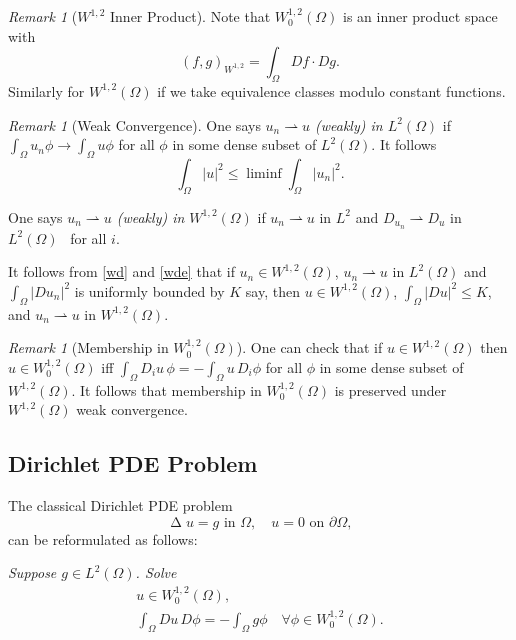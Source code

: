 \documentclass[a4paper]{amsart}
\theoremstyle{plain}
\theoremstyle{definition}
\theoremstyle{remark}
\newtheorem{remark}[theorem]{Remark}
\DeclareMathOperator{\lap}{\Delta}
\begin{document}
\begin{remark}[$ W^{1,2}$ Inner  Product] Note that $ W_0^{1,2} (\Omega)$ is an inner product space with 
\[
(f,g)_{W^{1,2}} = \int_\Omega Df\cdot Dg .
\]
Similarly for $ W^{1,2}(\Omega) $ if we take equivalence classes modulo  constant functions.
 \end{remark} 
 
 \begin{remark}[Weak Convergence]   \label{rwc}  One says  \emph{$ u_n  \rightharpoonup u $ (weakly) in $ L^2 (\Omega)$} if $ \int_\Omega u_n \phi \to  \int_\Omega u \phi $ for all $ \phi $ in some dense subset of $ L^2(\Omega ) $. It follows
 \[
 \int_\Omega |u|^2 \leq \liminf  \int_\Omega |u_n|^2.
 \]
 
 One says \emph{$ u_n  \rightharpoonup u $ (weakly) in $ W^{1,2}(\Omega) $} if $ u_n  \rightharpoonup u $   in $ L^2 $ and $ D_{u_n}  \rightharpoonup D_u $   in $ L^2 (\Omega)$ \ for all $ i $. 
 
 It follows from \eqref{wd} and \eqref{wde} that if $  u_n \in W^{1,2}(\Omega) $, $ u_n \rightharpoonup u $ in $ L^2(\Omega) $ and $ \int_\Omega|Du_n|^2 $ is uniformly bounded by $ K $ say, then $ u \in W^{1,2}(\Omega)$, $ \int_\Omega |Du|^2 \leq K $, and $ u_n \rightharpoonup u $ in $ W^{1,2}(\Omega) $. 
  \end{remark} 
  
\begin{remark}[Membership in $ W_0^{1,2}(\Omega) $] \label{rmw} One can check that if $ u \in W^{1,2}(\Omega) $ then $ u \in W_0^{1,2}(\Omega) $ iff 
$\int_\Omega D_i u\, \phi = -\int_{\Omega} u\, D_i   \phi   $ for all $ \phi $ in some dense subset of $ W^{1,2} (\Omega)$.   It follows that membership in $ W_0^{1,2}(\Omega) $ is preserved under  $ W ^{1,2}(\Omega) $ weak convergence.
 \end{remark} 
  
  
  
  
\subsection{Dirichlet PDE Problem}  The classical Dirichlet PDE problem
\[
\lap u =  g \text{  in }\Omega, \quad u = 0 \text{ on } \partial \Omega,
\]
can be reformulated as follows:

\medskip
\emph{Suppose $ g \in L^2(\Omega) $.  Solve}
\begin{equation}\label{ddp}
\begin{gathered}
u \in W_0^{1,2} (\Omega), \\
\int_\Omega Du\,  D\phi = - \int_\Omega g\phi \quad \forall \phi \in W_0^{1,2} (\Omega).
\end{gathered} 
\end{equation} 
\end{document}
